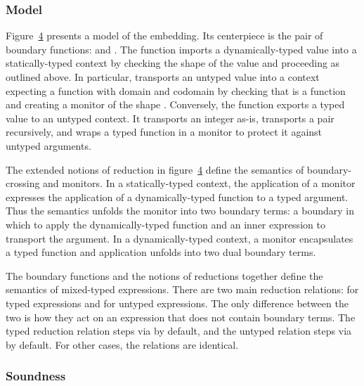 \documentclass[screen=true, 10pt, acmsmall]{acmart}
\newcommand{\Ssubsubsection}[2]{\subsubsection[#1]{#2}}
\newcommand{\FigureRef}[2]{#1}
\newcommand{\holong}{higher-order}
\newcommand{\hoshort}{H}
\newcommand{\tarrow}{\Rightarrow}
\newcommand{\tarr}[2]{#1\!\tarrow\!#2}
\newcommand{\vdyn}{\mathsf{dyn}}
\newcommand{\vsta}{\mathsf{stat}}
\newcommand{\rrfont}[1]{\mathsf{#1}}
\newcommand{\vfromsta}{\mathcal{S}}
\newcommand{\vfromdyn}{\mathcal{D}}
\newcommand{\vfromdynN}{\vfromdyn_{\rrfont{\hoshort}}}
\newcommand{\vfromstaN}{\vfromsta_{\rrfont{\hoshort}}}
\newcommand{\rrsymb}{\vartriangleright}
\newcommand{\rrD}{\mathrel{\rrsymb_{\rrfont{D}}}}
\newcommand{\rrS}{\mathrel{\rrsymb_{\rrfont{S}}}}
\newcommand{\rrarrow}{\rightarrow}
\newcommand{\rastar}{\rrarrow^{*}}
\newcommand{\rrNSstar}{\rastar_{\rrfont{\hoshort{\mhyphen}S}}}
\newcommand{\rrNDstar}{\rastar_{\rrfont{\hoshort{\mhyphen}D}}}
\newcommand{\vmon}[2]{\mathsf{mon}\,#1\,#2}
\newcommand{\vmonfun}[2]{\vmon{#1}{#2}}
\begin{document}
\Ssubsubsection{Model}{Model}\label{t:x28part_x22secx3anaturalx3amodelx22x29}

Figure~\hyperref[t:x28counter_x28x22figurex22_x22figx3anaturalx2dreductionx22x29x29]{\FigureRef{4}{t:x28counter_x28x22figurex22_x22figx3anaturalx2dreductionx22x29x29}} presents a model of the \relax{\holong} embedding.
Its centerpiece is the pair of boundary functions:
 \relax{$\vfromdynN$} and \relax{$\vfromstaN$}.
The \relax{$\vfromdynN$} function imports a dynamically{-}typed value into a statically{-}typed
 context by checking the shape of the value and proceeding as outlined above.
In particular, \relax{$\vfromdynN$} transports an untyped value  into a
 context expecting a function with domain  and codomain 
 by checking that  is a function and creating a monitor of the shape
 \relax{$(\vmonfun{(\tarr{\tau_d}{\tau_c})}{v})$}.
Conversely, the \relax{$\vfromstaN$} function exports a typed value to an untyped context.
It transports an integer as{-}is, transports a pair recursively,
 and wraps a typed function in a monitor to protect it against untyped arguments.

The extended notions of reduction in figure~\hyperref[t:x28counter_x28x22figurex22_x22figx3anaturalx2dreductionx22x29x29]{\FigureRef{4}{t:x28counter_x28x22figurex22_x22figx3anaturalx2dreductionx22x29x29}} define
 the semantics of boundary{-}crossing and monitors.
In a statically{-}typed context, the application of a monitor expresses
 the application of a dynamically{-}typed function to a typed argument.
Thus the semantics unfolds the monitor into two boundary terms:
 a \relax{$\vdyn$} boundary in which to apply the dynamically{-}typed function
 and an inner \relax{$\vsta$} expression to transport the argument.
In a dynamically{-}typed context, a monitor encapsulates a typed function and
 application unfolds into two dual boundary terms.

The boundary functions and the notions of reductions together
 define the semantics of mixed{-}typed expressions.
There are two main reduction relations: \relax{$\rrNSstar$} for typed expressions
 and \relax{$\rrNDstar$} for untyped expressions.
The only difference between the two is how they act on an expression that
 does not contain boundary terms.
The typed reduction relation steps via \relax{$\rrS$} by default, and the
 untyped relation steps via \relax{$\rrD$} by default.
For other cases, the relations are identical.

\Ssubsubsection{Soundness}{Soundness}\label{t:x28part_x22secx3anaturalx3asoundnessx22x29}
\end{document}
